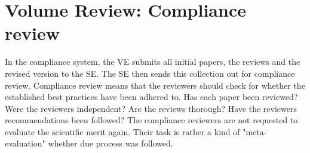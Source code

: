 \documentclass[border=20pt]{article}
\begin{document}
\section*{Volume Review: Compliance review}


In the compliance system, the VE submits all initial papers, the reviews and the revised version to the SE. The SE then sends this collection out for compliance review. Compliance review means that the reviewers should check for whether the established best practices have been adhered to. Has each paper been reviewed? Were the reviewers independent? Are the reviews thorough? Have the reviewers recommendations been followed? The compliance reviewers are not requested to evaluate the scientific merit again. Their task is rather a kind of "meta-evaluation" whether due process was followed. 
\end{document}
